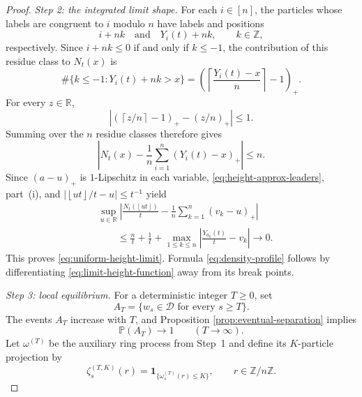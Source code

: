 \documentclass[10pt,a4paper]{amsart}
\newcommand{\Pp}{\mathbb P}
\newcommand{\R}{\mathbb R}
\newcommand{\Z}{\mathbb Z}
\newcommand{\abs}[1]{\left|#1\right|}
\newcommand{\cD}{\mathcal D}
\newcommand{\ceil}[1]{\left\lceil #1\right\rceil}
\newcommand{\floor}[1]{\left\lfloor #1\right\rfloor}
\newcommand{\one}{\mathbf 1}
\newcommand{\pospart}[1]{\left(#1\right)_{+}}
\begin{document}
\begin{proof}
		\medskip
		\noindent\emph{Step 2: the integrated limit shape.}
		For each $i\in[n]$, the particles whose labels are congruent to $i$ modulo
		$n$ have labels and positions
		\begin{equation}\label{eq:class-particles}
			i+nk
			\quad\text{and}\quad
			Y_i(t)+nk,
			\qquad k\in\Z,
		\end{equation}
		respectively.  Since $i+nk\le0$ if and only if $k\le-1$, the contribution of
		this residue class to $N_t(x)$ is
		\begin{equation}\label{eq:class-count-exact}
			\#\{k\le-1:Y_i(t)+nk>x\}
			=\pospart{\ceil{\frac{Y_i(t)-x}{n}}-1}.
		\end{equation}
		For every $z\in\R$,
		\[
		\abs{\pospart{\ceil{z/n}-1}-\pospart{z/n}}\le1.
		\]
		Summing over the $n$ residue classes therefore gives
		\begin{equation}\label{eq:height-approx-leaders}
			\abs{N_t(x)-\frac1n\sum_{i=1}^n\pospart{Y_i(t)-x}}
			\le n.
		\end{equation}
		Since $(a-u)_+$ is $1$-Lipschitz in each variable,
		\eqref{eq:height-approx-leaders}, part~(i), and
		$\abs{\floor{ut}/t-u}\le t^{-1}$ yield
		\begin{align*}
			&\sup_{u\in\R}
			\abs{\frac{N_t(\floor{ut})}{t}
				-\frac1n\sum_{k=1}^n\pospart{v_k-u}}\\
			&\qquad\le \frac nt+\frac1t
			+\max_{1\le k\le n}
			\abs{\frac{Y_{a_k}(t)}t-v_k}
			\longrightarrow0.
		\end{align*}
		This proves \eqref{eq:uniform-height-limit}.  Formula
		\eqref{eq:density-profile} follows by differentiating
		\eqref{eq:limit-height-function} away from its break points.
		
		\medskip
		\noindent\emph{Step 3: local equilibrium.}
		For a deterministic integer $T\ge0$, set
		\begin{equation}\label{eq:AT-definition}
			A_T=\{w_s\in\cD\text{ for every }s\ge T\}.
		\end{equation}
		The events $A_T$ increase with $T$, and Proposition
		\ref{prop:eventual-separation} implies
		\begin{equation}\label{eq:AT-probability}
			\Pp(A_T)\longrightarrow1
			\qquad(T\to\infty).
		\end{equation}
		Let $\omega^{(T)}$ be the auxiliary ring process from Step~1 and define its
		$K$-particle projection by
		\begin{equation}\label{eq:ring-K-projection}
			\zeta_s^{(T,K)}(r)
			=\one_{\{\omega_s^{(T)}(r)\le K\}},
			\qquad r\in\Z/n\Z.
		\end{equation}
		

\end{proof}
\end{document}
